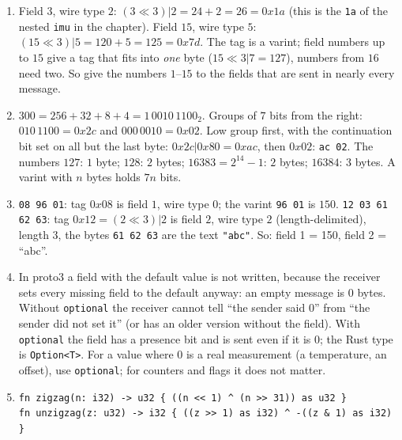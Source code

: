 \begin{enumerate}[label=\textbf{\ansnum.\arabic*}]
  \item Field $3$, wire type $2$: $(3\ll3)|2=24+2=26=0x1a$ (this is the \verb!1a! of the nested \verb!imu! in the chapter). Field $15$, wire type $5$: $(15\ll3)|5=120+5=125=0x7d$. The tag is a varint; field numbers up to $15$ give a tag that fits into \emph{one} byte ($15\ll3|7=127$), numbers from $16$ need two. So give the numbers $1$--$15$ to the fields that are sent in nearly every message.
  \item $300=256+32+8+4=1\,0010\,1100_2$. Groups of $7$ bits from the right: $010\,1100=0x2c$ and $000\,0010=0x02$. Low group first, with the continuation bit set on all but the last byte: $0x2c|0x80=0xac$, then $0x02$: \verb!ac 02!. The numbers $127$: $1$ byte; $128$: $2$ bytes; $16383=2^{14}-1$: $2$ bytes; $16384$: $3$ bytes. A varint with $n$ bytes holds $7n$ bits.
  \item \verb!08 96 01!: tag $0x08$ is field $1$, wire type $0$; the varint \verb!96 01! is $150$. \verb!12 03 61 62 63!: tag $0x12=(2\ll3)|2$ is field $2$, wire type $2$ (length-delimited), length $3$, the bytes \verb!61 62 63! are the text \verb!"abc"!. So: field 1 = 150, field 2 = ``abc''.
  \item In proto3 a field with the default value is not written, because the receiver sets every missing field to the default anyway: an empty message is $0$ bytes. Without \verb!optional! the receiver cannot tell ``the sender said $0$'' from ``the sender did not set it'' (or has an older version without the field). With \verb!optional! the field has a presence bit and is sent even if it is $0$; the Rust type is \verb!Option<T>!. For a value where $0$ is a real measurement (a temperature, an offset), use \verb!optional!; for counters and flags it does not matter.
  \item
\begin{verbatim}
fn zigzag(n: i32) -> u32 { ((n << 1) ^ (n >> 31)) as u32 }
fn unzigzag(z: u32) -> i32 { ((z >> 1) as i32) ^ -((z & 1) as i32) }


\end{verbatim}
\end{enumerate}
